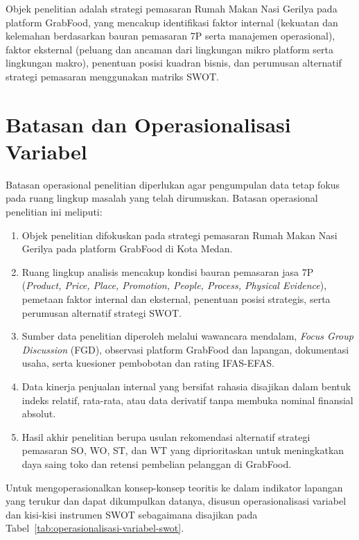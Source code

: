 Objek penelitian adalah strategi pemasaran Rumah Makan Nasi Gerilya pada platform GrabFood, yang mencakup identifikasi faktor internal (kekuatan dan kelemahan berdasarkan bauran pemasaran 7P serta manajemen operasional), faktor eksternal (peluang dan ancaman dari lingkungan mikro platform serta lingkungan makro), penentuan posisi kuadran bisnis, dan perumusan alternatif strategi pemasaran menggunakan matriks SWOT.

\section{Batasan dan Operasionalisasi Variabel}
Batasan operasional penelitian diperlukan agar pengumpulan data tetap fokus pada ruang lingkup masalah yang telah dirumuskan. Batasan operasional penelitian ini meliputi:
\begin{enumerate}
    \item Objek penelitian difokuskan pada strategi pemasaran Rumah Makan Nasi Gerilya pada platform GrabFood di Kota Medan.
    \item Ruang lingkup analisis mencakup kondisi bauran pemasaran jasa 7P (\textit{Product, Price, Place, Promotion, People, Process, Physical Evidence}), pemetaan faktor internal dan eksternal, penentuan posisi strategis, serta perumusan alternatif strategi SWOT.
    \item Sumber data penelitian diperoleh melalui wawancara mendalam, \textit{Focus Group Discussion} (FGD), observasi platform GrabFood dan lapangan, dokumentasi usaha, serta kuesioner pembobotan dan rating IFAS-EFAS.
    \item Data kinerja penjualan internal yang bersifat rahasia disajikan dalam bentuk indeks relatif, rata-rata, atau data derivatif tanpa membuka nominal finansial absolut.
    \item Hasil akhir penelitian berupa usulan rekomendasi alternatif strategi pemasaran SO, WO, ST, dan WT yang diprioritaskan untuk meningkatkan daya saing toko dan retensi pembelian pelanggan di GrabFood.
\end{enumerate}

Untuk mengoperasionalkan konsep-konsep teoritis ke dalam indikator lapangan yang terukur dan dapat dikumpulkan datanya, disusun operasionalisasi variabel dan kisi-kisi instrumen SWOT sebagaimana disajikan pada Tabel~\ref{tab:operasionalisasi-variabel-swot}.

